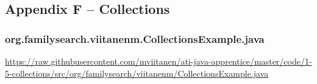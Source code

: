 \subsection*{Appendix F -- Collections} \label{App:AppendixF}

\subsubsection*{org.familysearch.viitanenm.CollectionsExample.java}
\noindent
\begin{minipage}{.6in}
\end{minipage}
\begin{minipage}{6in}
  \url{https://raw.githubusercontent.com/mviitanen/ati-java-apprentice/master/code/1-5-collections/src/org/familysearch/viitanenm/CollectionsExample.java}
\end{minipage}